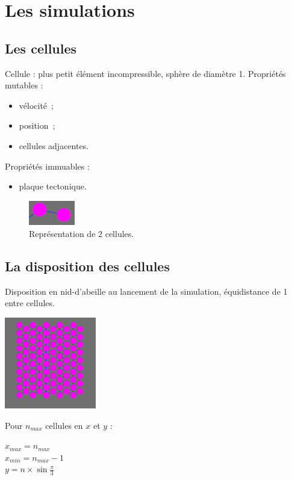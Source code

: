 \documentclass{beamer}
\begin{document}
\section{Les simulations}

\subsection{Les cellules}
\begin{frame}
  Cellule : plus petit élément incompressible, sphère de diamètre 1. \smallbreak
  Propriétés mutables :
  \begin{itemize}
   \item vélocité~;
   \item position~;
   \item cellules adjacentes.
  \end{itemize}
  Propriétés immuables :
  \begin{itemize}
   \item plaque tectonique.
  \end{itemize}
  \begin{figure}
    \begin{center}
      \includegraphics[width=2cm]{Images/cellule.png}
    \end{center}
    \caption{Représentation de 2 cellules.}
  \end{figure}
\end{frame}

\subsection{La disposition des cellules}
\begin{frame}
  Disposition en nid-d'abeille au lancement de la simulation, équidistance de 1 entre cellules.
  \begin{center}
    \includegraphics[width=4cm]{Images/hexagone.png}
  \end{center}
  Pour $n_{max}$ cellules en $x$ et $y$ : \\
  \begin{center}
    $x_{max} = n_{max}$ \\
    $x_{min} = n_{max} - 1$ \\
    $y = n \times \sin{\frac{\pi}{3}}$
  \end{center}
\end{frame}
\end{document}
